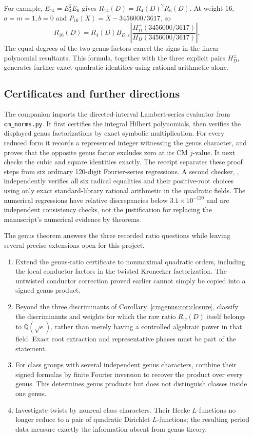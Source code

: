 For example, $E_{14}=E_4^2E_6$ gives
$R_{14}(D)=R_4(D)^2R_6(D)$.
At weight $16$, $a=m=1,b=0$ and
$P_{16}(X)=X-3456000/3617$, so
\[
 R_{16}(D)=R_4(D)B_{D,\varepsilon}
    \left|\frac{H_D^+(3456000/3617)}
                 {H_D^-(3456000/3617)}\right|.
\]
The equal degrees of the two genus factors cancel the signs in the
linear-polynomial resultants. This formula, together with the three
explicit pairs $H_D^\pm$, generates further exact quadratic identities
using rational arithmetic alone.


\subsection{Certificates and further directions}

The companion  imports the directed-interval
Lambert-series evaluator from \mbox{\texttt{cm\_norms.py}}. It first certifies
the integral Hilbert polynomials, then verifies the displayed genus
factorizations by exact symbolic multiplication. For every reduced
form it records a represented integer witnessing the genus character,
and proves that the opposite genus factor excludes zero at its CM
$j$-value. It next checks the cubic and square identities exactly.
The receipt  separates these proof steps
from six ordinary 120-digit Fourier-series regressions. A second checker, , independently verifies
all six radical equalities and their positive-root choices using only exact
standard-library rational arithmetic in the quadratic fields. The numerical regressions
have relative discrepancies below $3.1\times10^{-120}$ and are
independent consistency checks, not the justification for replacing
the manuscript's numerical evidence by theorems.

The genus theorem answers the three recorded ratio questions while
leaving several precise extensions open for this project.
\begin{enumerate}
\item Extend the genus-ratio certificate to nonmaximal quadratic
orders, including the local conductor factors in the twisted
Kronecker factorization. The untwisted conductor correction proved
earlier cannot simply be copied into a signed genus product.
\item Beyond the three discriminants of Corollary~\ref{cmgenus:cor:closure},
classify the discriminants and weights for which the raw ratio
$R_w(D)$ itself belongs to $\mathbb Q(\sqrt e)$, rather than merely
having a controlled algebraic power in that field. Exact root
extraction and representative phases must be part of the statement.
\item For class groups with several independent genus characters,
combine their signed formulas by finite Fourier inversion to recover
the product over every genus. This determines genus products but does
not distinguish classes inside one genus.
\item Investigate twists by nonreal class characters. Their Hecke
$L$-functions no longer reduce to a pair of quadratic Dirichlet
$L$-functions; the resulting period data measure exactly the
information absent from genus theory.
\end{enumerate}

